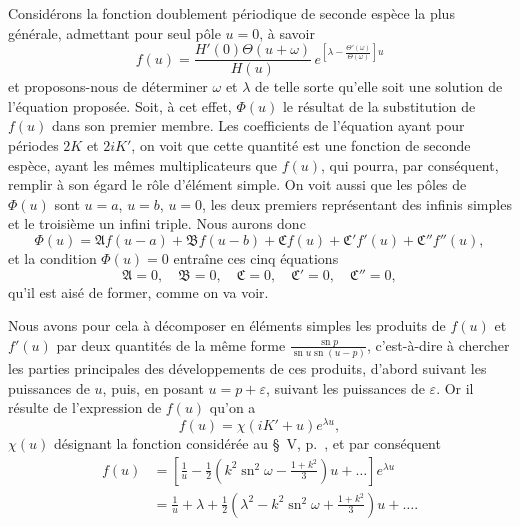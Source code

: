 \documentclass[11pt,leqno,oneside,letterpaper]{book}[2005/09/16]
\DeclareMathOperator{\sn}{sn}
\begin{document}
Consid\'erons la fonction doublement p\'eriodique de seconde esp\`ece
la plus g\'en\'erale, admettant pour seul p\^ole $u = 0$, \`a savoir
\[
f(u) = \frac{ H'(0)\Theta(u + \omega) }{ H(u) }\,
  e^{ \left[ \lambda - \frac{\Theta'(\omega)}{\Theta(\omega)} \right] u }
\]
et proposons-nous de d\'eterminer $\omega$ et $\lambda$ de telle sorte qu'elle soit une solution
de l'\'equation propos\'ee. Soit, \`a cet effet, $\Phi(u)$ le r\'esultat de la substitution
de $f(u)$ dans son premier membre. Les coefficients de l'\'equation
ayant pour p\'eriodes $2K$ et $2iK'$, on voit que cette quantit\'e est une fonction
de seconde esp\`ece, ayant les m\^emes multiplicateurs que $f(u)$, qui pourra,
par cons\'equent, remplir \`a son \'egard le r\^ole d'\'el\'ement simple. On voit
aussi que les p\^oles de $\Phi(u)$ sont $u = a$, $u = b$, $u = 0$, les deux premiers
repr\'esentant des infinis simples et le troisi\`eme un infini triple. Nous aurons
donc
\[
\Phi(u) =
  \mathfrak{A}   f(u - a) +
  \mathfrak{B}   f(u - b) +
  \mathfrak{C}   f(u) +
  \mathfrak{C'}  f'(u) +
  \mathfrak{C''} f''(u),
\]
et la condition $\Phi(u) = 0$ entra\^ine ces cinq \'equations
\[
\mathfrak{A}  = 0, \quad
\mathfrak{B}  = 0, \quad
\mathfrak{C}  = 0, \quad
\mathfrak{C'} = 0, \quad
\mathfrak{C''}= 0,
\]
qu'il est ais\'e de former, comme on va voir.

Nous avons pour cela \`a d\'ecomposer en \'el\'ements simples les produits
de $f(u)$ et $f'(u)$ par deux quantit\'es de la m\^eme forme $\frac{ \sn p }{ \sn u \sn (u-p) }$, c'est-\`a-dire
\`a chercher les parties principales des d\'eveloppements de ces produits,
d'abord suivant les puissances de $u$, puis, en posant $u = p+\varepsilon$,
suivant les puissances de $\varepsilon$. Or il r\'esulte de l'expression de $f(u)$ qu'on a
\[
f(u) = \chi( iK' + u ) e^{ \lambda u },
\]
$\chi(u)$ d\'esignant la fonction consid\'er\'ee au \S~V, p.~\pageref{page12},
et par cons\'equent
\begin{align*}
f(u) &= \left[ \frac{1}{u}
  - \frac{1}{2} \left( k^2 \sn^2 \omega - \frac{1 + k^2}{3} \right) u
  + \ldots \right] e^{\lambda u} \\
&= \frac{1}{u} + \lambda
  + \frac{1}{2} \left( \lambda^2 - k^2 \sn^2 \omega
  + \frac{1 + k^2}{3} \right) u + \ldots.
\end{align*}
\end{document}
